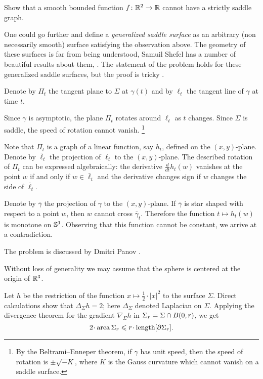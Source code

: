 \begin{pr}
Show that a smooth bounded function $f\colon\mathbb{R}^2\to\mathbb{R}$ cannot have a strictly saddle graph.
\end{pr}

One could go further and define a \emph{generalized saddle surface} as an arbitrary (non necessarily smooth) surface satisfying the observation above.
The geometry of these surfaces is far from being understood,
Samuil Shefel has a number of beautiful results about them, 
\cite[see][and the references therein]{shefel, AKP-invitation}.
The statement of the problem holds for these generalized saddle surfaces, but
the proof is tricky \cite{petrunin-stadler}.


Denote by $\Pi_t$ the tangent plane to $\Sigma$ at $\gamma(t)$ and by $\ell_t$ the tangent line of $\gamma$ at time $t$.

Since $\gamma$ is asymptotic, the plane $\Pi_t$ rotates around $\ell_t$ as $t$ changes.
Since $\Sigma$ is saddle, the speed of rotation cannot vanish.%
\footnote{By the Beltrami--Enneper theorem, if $\gamma$ has unit speed, then the speed of rotation is $\pm\sqrt{-K}$, where $K$ is the Gauss curvature which cannot vanish on a saddle surface.}

Note that $\Pi_t$ is a graph of a linear function, say $h_t$, defined on the $(x, y)$-plane.
Denote by $\bar\ell_t$ the projection of $\ell_t$ to the $(x, y)$-plane.
The described rotation of $\Pi_t$ can be expressed algebraically:
the derivative $\tfrac{d}{dt}h_t(w)$ vanishes at the point $w$ if and only if $w\in \bar\ell_t$ 
and the derivative changes sign if $w$ changes the side of $\bar\ell_t$.

Denote by $\bar\gamma$ the projection of $\gamma$ to the $(x, y)$-plane.
If $\bar\gamma$ is star shaped with respect to a point $w$, then $w$ cannot cross $\bar\gamma_t$.
Therefore the function $t\mapsto h_t(w)$ is monotone on $\mathbb{S}^1$.
Observing that this function cannot be constant, we arrive at a contradiction.\qeds

The problem is discussed by Dmitri Panov \cite{panov-curves}.

Without loss of generality we may assume that the sphere is centered at the origin of $\mathbb{R}^3$.

Let $h$ be the restriction of the function $x\mapsto \tfrac12\cdot|x|^2$ to the surface $\Sigma$.
Direct calculations show that $\Delta_\Sigma h =  2$;
here $\Delta_\Sigma$ denoted Laplacian on $\Sigma$.
Applying the divergence theorem for the gradient $\nabla_\Sigma h$
in $\Sigma_r\z=\Sigma\cap B(0,r)$, we get
\[2\cdot \area\Sigma_r\le r\cdot\length [\partial\Sigma_r].\]


